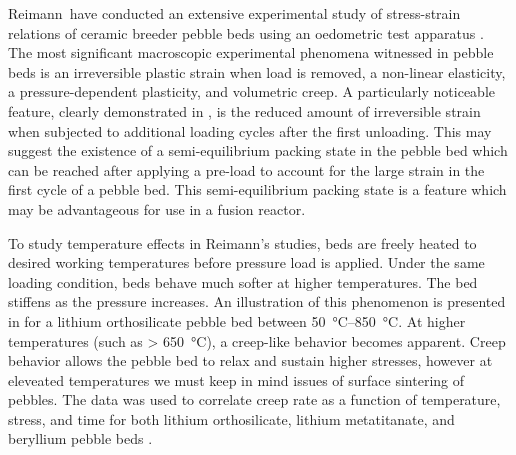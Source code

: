 Reimann\etal~have conducted an extensive experimental study of stress-strain relations of ceramic breeder pebble beds using an oedometric test apparatus \cite{Piazza2002811,Reimann:2002kl,Reimann:2003qc,Reimann:2002mi,Reimann:2001il}. The most significant macroscopic experimental phenomena witnessed in pebble beds is an irreversible plastic strain when load is removed, a non-linear elasticity, a pressure-dependent plasticity, and volumetric creep.  A particularly noticeable feature, clearly demonstrated in , is the reduced amount of irreversible strain when subjected to additional loading cycles after the first unloading. This may suggest the existence of a semi-equilibrium packing state in the pebble bed which can be reached after applying a pre-load to account for the large strain in the first cycle of a pebble bed. This semi-equilibrium packing state is a feature which may be advantageous for use in a fusion reactor.

To study temperature effects in Reimann's studies, beds are freely heated to desired working temperatures before pressure load is applied. Under the same loading condition, beds behave much softer at higher temperatures. The bed stiffens as the pressure increases. An illustration of this phenomenon is presented in  for a lithium orthosilicate pebble bed between \SIrange{50}{850}{\celsius}. At higher temperatures (such as > \SI{650}{\celsius}), a creep-like behavior becomes apparent. Creep behavior allows the pebble bed to relax and sustain higher stresses, however at eleveated temperatures we must keep in mind issues of surface sintering of pebbles. The data was used to correlate creep rate as a function of temperature, stress, and time for both lithium orthosilicate, lithium metatitanate, and beryllium pebble beds \cite{Buhler:2002qf,Reimann:2001il,Reimann2005}.


